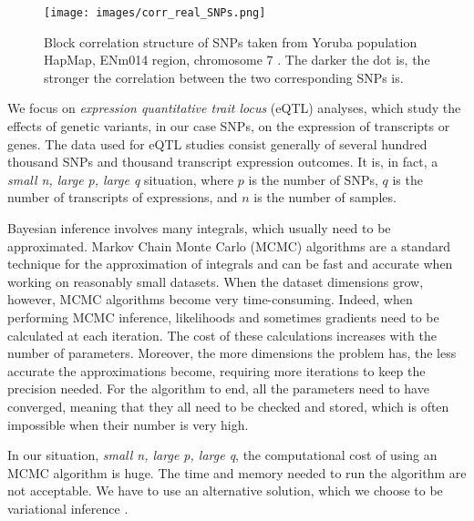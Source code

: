 \documentclass[a4paper, 11pt]{report}
\numberwithin{equation}{chapter}
\begin{document}
\begin{figure}[h!]
\texttt{[image: images/corr\_real\_SNPs.png]}
\caption{\label{fig:corr} Block correlation structure of SNPs taken from Yoruba population HapMap, ENm014 region, chromosome $7$ \cite{hapmap}. The darker the dot is, the stronger the correlation between the two corresponding SNPs is.}
\end{figure}

We focus on \textit{expression quantitative trait locus} (eQTL) analyses, which study the effects of genetic variants, in our case SNPs, on the expression of transcripts or genes. The data used for eQTL studies consist generally of several hundred thousand SNPs and thousand transcript expression outcomes. It is, in fact, a \textit{small n, large p, large q} situation, where $p$ is the number of SNPs, $q$ is the number of transcripts of expressions, and $n$ is the number of samples.

Bayesian inference involves many integrals, which usually need to be approximated. Markov Chain Monte Carlo (MCMC) algorithms are a standard technique for the approximation of integrals and can be fast and accurate when working on reasonably small datasets. When the dataset dimensions grow, however, MCMC algorithms become very time-consuming. Indeed, when performing MCMC inference, likelihoods and sometimes gradients need to be calculated at each iteration. The cost of these calculations increases with the number of parameters. Moreover, the more dimensions the problem has, the less accurate the approximations become, requiring more iterations to keep the precision needed. For the algorithm to end, all the parameters need to have converged, meaning that they all need to be checked and stored, which is often impossible when their number is very high.

In our situation, \textit{small n, large p, large q}, the computational cost of using an MCMC algorithm is huge. The time and memory needed to run the algorithm are not acceptable. We have to use an alternative solution, which we choose to be variational inference \cite{varInf}. 

\newpage
\end{document}
